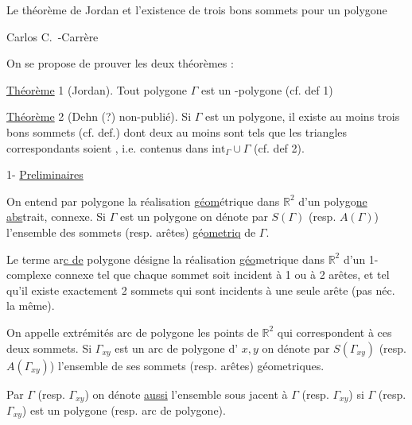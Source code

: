 Le théorème de Jordan et l'existence de trois bons sommets pour un polygone 

\hspace*{\fill}Carlos C.~-Carrère\hspace*{\fill}

\margin{$\bullet$}On se propose de prouver les deux théorèmes  :

\uline{Théorème} 1 (Jordan). Tout polygone $\Gamma$ est un -polygone (cf. def 1)

\uline{Théorème} 2 (Dehn (?) non-publié). Si $\Gamma$ est un polygone, il existe au moins trois bons sommets (cf. def.\hspace{1em}) dont deux au moins sont tels que les triangles correspondants soient , i.e. contenus dans $\mathrm{int}_{\Gamma}\cup\Gamma$ (cf. def 2).

1- \uline{Preliminaires}

\margin{$\bullet\ \bullet$}On entend par polygone la réalisation \uline{géom}étrique dans \uline{$\mathbb{R}^{2}$} d'un \margin{$\bullet$}polygo\uline{ne abs}trait, connexe. Si $\Gamma$ est un polygone on dénote par \margin{$\bullet$}$S(\Gamma)$ (resp. $A(\Gamma)$) l'ensemble des sommets (resp. arêtes) gé\uline{ometriq} de $\Gamma$.

\margin{$\cdot\quad\cdot$}Le terme ar\uline{c de} polygone désigne la réalisation \uline{géo}metrique dans $\mathbb{R}^{2}$ d'un 1-complexe connexe\unsure{$\langle$|,} tel que chaque sommet soit incident à 1 ou à 2 arêtes, et tel qu'il existe exactement 2 sommets qui sont incidents à une seule arête (pas néc. la même).

On appelle extrémités  arc de polygone les points de $\mathbb{R}^{2}$ qui correspondent à ces deux sommets. Si $\Gamma_{xy}$ est un arc de polygone d' $x,y$ on dénote par $S(\Gamma_{xy})$ (resp. $A(\Gamma_{xy})$) l'ensemble de ses sommets (resp. arêtes) géometriques.

\margin{$\bullet$}Par $\Gamma$ (resp. $\Gamma_{xy}$) on dénote \uline{aussi} l'ensemble  sous jacent à $\Gamma$ (resp. $\Gamma_{xy}$) si $\Gamma$  (resp. $\Gamma_{xy}$) est un polygone (resp. arc de polygone).

